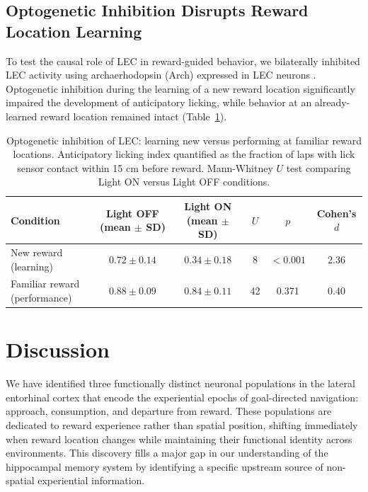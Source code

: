\documentclass[11pt]{article}
\begin{document}
\subsection{Optogenetic Inhibition Disrupts Reward Location Learning}

To test the causal role of LEC in reward-guided behavior, we bilaterally inhibited LEC activity using archaerhodopsin (Arch) expressed in LEC neurons \citep{chow2010}. Optogenetic inhibition during the learning of a new reward location significantly impaired the development of anticipatory licking, while behavior at an already-learned reward location remained intact (Table~\ref{tab:optogenetics}).

\begin{table}[H]
\centering
\caption{Optogenetic inhibition of LEC: learning new versus performing at familiar reward locations. Anticipatory licking index quantified as the fraction of laps with lick sensor contact within 15 cm before reward. Mann-Whitney $U$ test comparing Light ON versus Light OFF conditions.}
\label{tab:optogenetics}
\begin{tabular}{lccccc}
\toprule
\textbf{Condition} & \textbf{Light OFF (mean $\pm$ SD)} & \textbf{Light ON (mean $\pm$ SD)} & \textbf{$U$} & \textbf{$p$} & \textbf{Cohen's $d$} \\
\midrule
New reward (learning) & $0.72 \pm 0.14$ & $0.34 \pm 0.18$ & 8 & $< 0.001$ & 2.36 \\
Familiar reward (performance) & $0.88 \pm 0.09$ & $0.84 \pm 0.11$ & 42 & 0.371 & 0.40 \\
\bottomrule
\end{tabular}
\end{table}

\section{Discussion}

We have identified three functionally distinct neuronal populations in the lateral entorhinal cortex that encode the experiential epochs of goal-directed navigation: approach, consumption, and departure from reward. These populations are dedicated to reward experience rather than spatial position, shifting immediately when reward location changes while maintaining their functional identity across environments. This discovery fills a major gap in our understanding of the hippocampal memory system by identifying a specific upstream source of non-spatial experiential information.
\end{document}
